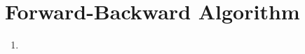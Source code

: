 \section{Forward-Backward Algorithm}

\begin{enumerate}
    \item 
\end{enumerate}
























